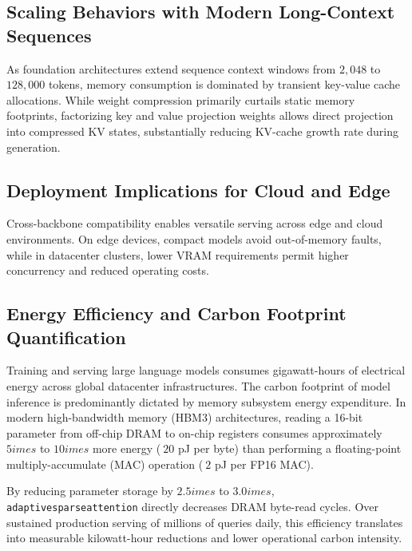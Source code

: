 \subsection{Scaling Behaviors with Modern Long-Context Sequences}
As foundation architectures extend sequence context windows from $2{,}048$ to $128{,}000$ tokens, memory consumption is dominated by transient key-value cache allocations. While weight compression primarily curtails static memory footprints, factorizing key and value projection weights allows direct projection into compressed KV states, substantially reducing KV-cache growth rate during generation.

\subsection{Deployment Implications for Cloud and Edge}
Cross-backbone compatibility enables versatile serving across edge and cloud environments. On edge devices, compact models avoid out-of-memory faults, while in datacenter clusters, lower VRAM requirements permit higher concurrency and reduced operating costs.

\subsection{Energy Efficiency and Carbon Footprint Quantification}
Training and serving large language models consumes gigawatt-hours of electrical energy across global datacenter infrastructures. The carbon footprint of model inference is predominantly dictated by memory subsystem energy expenditure. In modern high-bandwidth memory (HBM3) architectures, reading a 16-bit parameter from off-chip DRAM to on-chip registers consumes approximately $5	imes$ to $10	imes$ more energy ($~20$ pJ per byte) than performing a floating-point multiply-accumulate (MAC) operation ($~2$ pJ per FP16 MAC).

By reducing parameter storage by $2.5	imes$ to $3.0	imes$, \texttt{adaptivesparseattention} directly decreases DRAM byte-read cycles. Over sustained production serving of millions of queries daily, this efficiency translates into measurable kilowatt-hour reductions and lower operational carbon intensity.
